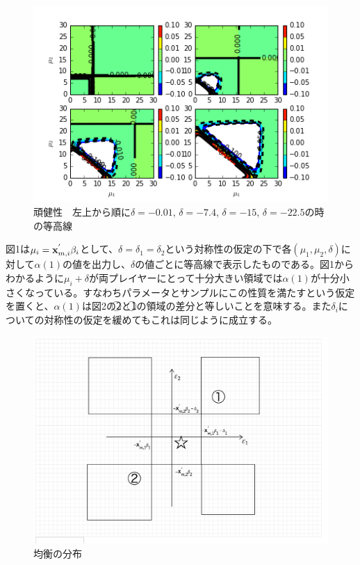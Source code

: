 \documentclass{jsarticle}
\begin{document}
\begin{figure}[h]
\centering
\includegraphics{diff3.png}
\caption{頑健性　左上から順に$\delta = -0.01$, $\delta = -7.4$, $\delta = -15$, $\delta = -22.5$の時の等高線}
\end{figure}

図1は$\mu_i = {\bf x}_{m, i}^{'} \beta_i$として、$\delta = \delta_1 = \delta_2$という対称性の仮定の下で各$(\mu_1, \mu_2, \delta)$に対して$\alpha(1)$の値を出力し、$\delta$の値ごとに等高線で表示したものである。図1からわかるように$\mu_i + \delta$が両プレイヤーにとって十分大きい領域では$\alpha(1)$が十分小さくなっている。すなわちパラメータとサンプルにこの性質を満たすという仮定を置くと、$\alpha(1)$は図2の\textcircled{\scriptsize 2}と\textcircled{\scriptsize 1}の領域の差分と等しいことを意味する。また$\delta_i$についての対称性の仮定を緩めてもこれは同じように成立する。

\begin{figure}[h]
\centering
\includegraphics[scale = 0.3]{brgraph.png}
\caption{均衡の分布}
\end{figure}
\end{document}
